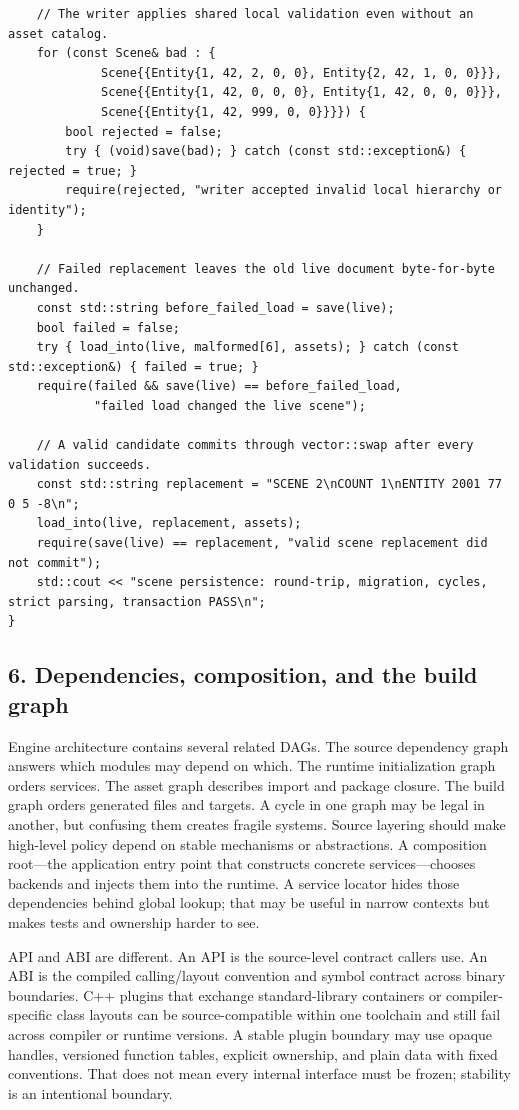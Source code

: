 \begin{verbatim}
    // The writer applies shared local validation even without an asset catalog.
    for (const Scene& bad : {
             Scene{{Entity{1, 42, 2, 0, 0}, Entity{2, 42, 1, 0, 0}}},
             Scene{{Entity{1, 42, 0, 0, 0}, Entity{1, 42, 0, 0, 0}}},
             Scene{{Entity{1, 42, 999, 0, 0}}}}) {
        bool rejected = false;
        try { (void)save(bad); } catch (const std::exception&) { rejected = true; }
        require(rejected, "writer accepted invalid local hierarchy or identity");
    }

    // Failed replacement leaves the old live document byte-for-byte unchanged.
    const std::string before_failed_load = save(live);
    bool failed = false;
    try { load_into(live, malformed[6], assets); } catch (const std::exception&) { failed = true; }
    require(failed && save(live) == before_failed_load,
            "failed load changed the live scene");

    // A valid candidate commits through vector::swap after every validation succeeds.
    const std::string replacement = "SCENE 2\nCOUNT 1\nENTITY 2001 77 0 5 -8\n";
    load_into(live, replacement, assets);
    require(save(live) == replacement, "valid scene replacement did not commit");
    std::cout << "scene persistence: round-trip, migration, cycles, strict parsing, transaction PASS\n";
}
\end{verbatim}

\subsection{6. Dependencies, composition, and the build graph}\label{05-engine-i-ch008-dependencies-composition-and-the-build-graph}

Engine architecture contains several related DAGs. The source dependency graph answers which modules may depend on which. The runtime initialization graph orders services. The asset graph describes import and package closure. The build graph orders generated files and targets. A cycle in one graph may be legal in another, but confusing them creates fragile systems. Source layering should make high-level policy depend on stable mechanisms or abstractions. A composition root---the application entry point that constructs concrete services---chooses backends and injects them into the runtime. A service locator hides those dependencies behind global lookup; that may be useful in narrow contexts but makes tests and ownership harder to see.

API and ABI are different. An API is the source-level contract callers use. An ABI is the compiled calling/layout convention and symbol contract across binary boundaries. C++ plugins that exchange standard-library containers or compiler-specific class layouts can be source-compatible within one toolchain and still fail across compiler or runtime versions. A stable plugin boundary may use opaque handles, versioned function tables, explicit ownership, and plain data with fixed conventions. That does not mean every internal interface must be frozen; stability is an intentional boundary.

